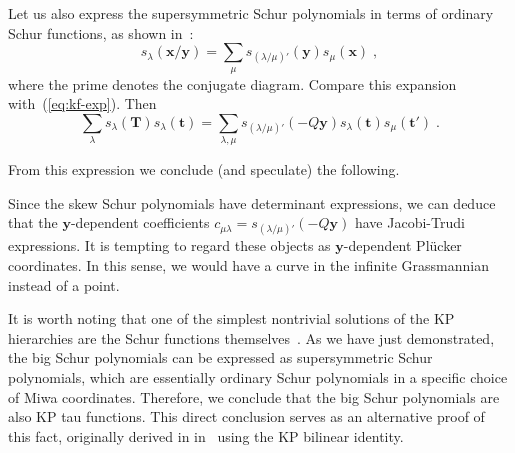\documentclass[a4paper,11pt]{amsart}
\begin{document}
Let us also express the supersymmetric Schur polynomials in terms of
ordinary Schur functions, as shown in~\cite[Sec. I.5, exerc. 23]{Macdonald:1998}:
\begin{equation}
  s_{\lambda}(\bm{x}/\bm{y}) = \sum_\mu s_{(\lambda/\mu)'}(\bm{y}) s_\mu(\bm{x})\; ,
\end{equation}
where the prime denotes the conjugate diagram. Compare this expansion
with~(\ref{eq:kf-exp}). Then
\begin{equation}
  \label{eq:tau-hl}
  \sum_{\lambda } s_\lambda(\bm{T}) s_\lambda(\bm{t}) =
  \sum_{\lambda,\mu } s_{(\lambda/\mu)'}(- Q\bm{y}) s_\lambda(\bm{t}) s_\mu(\bm{t}')\; .
\end{equation}

From this expression we conclude (and speculate) the following. 

\begin{remark}
Since the skew Schur polynomials have determinant expressions, we can
deduce that the \(\bm{y}\)-dependent coefficients \(c_{\mu \lambda} =
s_{(\lambda/\mu)'}(-Q\bm{y})\) have Jacobi-Trudi expressions. It is
tempting to regard these objects as \(\bm{y}\)-dependent Plücker
coordinates. In this sense, we would have a curve in the infinite
Grassmannian instead of a point.
\end{remark}

\begin{remark}
It is worth noting that one of the simplest nontrivial solutions of
the KP hierarchies are the Schur functions
themselves~\emph{\cite{Zabrodin2018}}. As we have just demonstrated, the big
Schur polynomials can be expressed as supersymmetric Schur
polynomials, which are essentially ordinary Schur polynomials in a
specific choice of Miwa coordinates. Therefore, we conclude that the
big Schur polynomials are also KP tau functions. This direct
conclusion serves as an alternative proof of this fact, originally derived in
in~\emph{\cite{Necoechea:2019wbg}} using the KP bilinear identity.
\end{remark}
\end{document}
